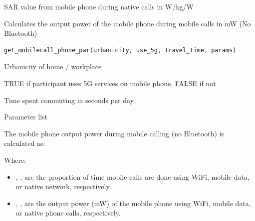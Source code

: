\documentclass[a4paper]{book}
\begin{document}
%
\begin{Value}
SAR value from mobile phone during native calls in W/kg/W
\end{Value}
%
\begin{Description}
Calculates the output power of the mobile phone during mobile calls in mW (No Bluetooth)
\end{Description}
%
\begin{Usage}
\begin{verbatim}
get_mobilecall_phone_pwr(urbanicity, use_5g, travel_time, params)
\end{verbatim}
\end{Usage}
%
\begin{Arguments}
\begin{ldescription}
\item[\code{urbanicity}] Urbanicity of home / workplace

\item[\code{use\_5g}] TRUE if participant uses 5G services on mobile phone, FALSE if not

\item[\code{travel\_time}] Time spent commuting in seconds per day

\item[\code{params}] Parameter list
\end{ldescription}
\end{Arguments}
%
\begin{Details}
The mobile phone output power during mobile calling (no Bluetooth) is calculated as:

Where:
\begin{itemize}

\item{} , ,  are the proportion of time mobile calls are done using WiFi, mobile data, or native network, respectively.
\item{} , ,  are the output power (mW) of the mobile phone using WiFi, mobile data, or native phone calls, respectively.

\end{itemize}

\end{Details}
\end{document}
